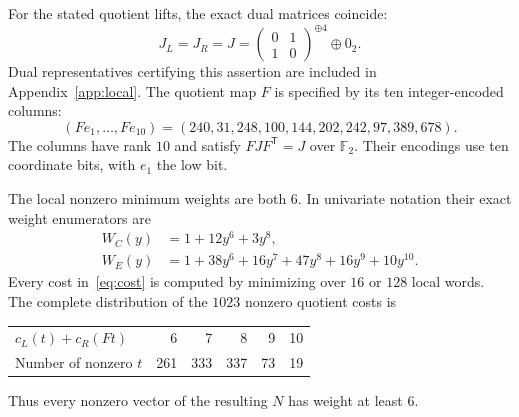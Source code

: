 \documentclass[11pt,a4paper]{article}
\newcommand{\F}{\mathbb F_2}
\begin{document}
For the stated quotient lifts, the exact dual matrices coincide:
\begin{equation}\label{eq:J}
 J_L=J_R=J=\begin{pmatrix}0&1\\1&0\end{pmatrix}^{\oplus4}\oplus 0_2.
\end{equation}
Dual representatives certifying this assertion are included in Appendix~\ref{app:local}. The quotient map $F$ is specified by its ten integer-encoded columns:
\begin{equation}\label{eq:Fcols}
 (Fe_1,\ldots,Fe_{10})=(240,31,248,100,144,202,242,97,389,678).
\end{equation}
The columns have rank $10$ and satisfy $FJF^{\mathsf T}=J$ over $\F$. Their encodings use ten coordinate bits, with $e_1$ the low bit.

The local nonzero minimum weights are both $6$. In univariate notation their exact weight enumerators are
\begin{align}
 W_C(y)&=1+12y^6+3y^8,\\
 W_E(y)&=1+38y^6+16y^7+47y^8+16y^9+10y^{10}.
\end{align}
Every cost in~\eqref{eq:cost} is computed by minimizing over $16$ or $128$ local words. The complete distribution of the $1023$ nonzero quotient costs is
\begin{center}
\begin{tabular}{@{}lrrrrr@{}}\toprule
$c_L(t)+c_R(Ft)$&6&7&8&9&10\\
Number of nonzero $t$&261&333&337&73&19\\\bottomrule
\end{tabular}
\end{center}
Thus every nonzero vector of the resulting $N$ has weight at least $6$.
\end{document}
